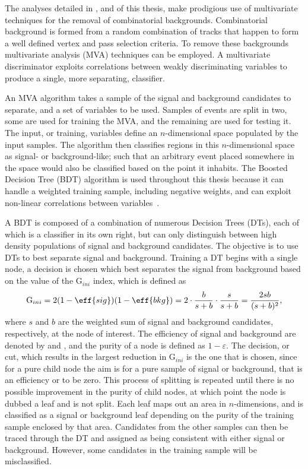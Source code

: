 
The analyses detailed in ,  and  of this thesis, make
prodigious use of multivariate techniques for the removal of combinatorial backgrounds.
Combinatorial background is formed from a random combination of tracks that happen to form a well
defined vertex and pass selection criteria.
To remove these backgrounds multivariate analysis (MVA) techniques can be employed.
A multivariate discriminator exploits correlations between weakly discriminating variables to
produce a single, more separating, classifier.

An MVA algorithm takes a sample of the signal and background candidates to separate, and a set of
variables to be used.
Samples of events are split in two, some are used for training the MVA, and the remaining are used
for testing it.
The input, or training, variables define an $n$-dimensional space populated by the input samples.
The algorithm then classifies regions in this $n$-dimensional space as signal- or background-like;
such that an arbitrary event placed somewhere in the space would also be classified based on the
point it inhabits.
The Boosted Decision Tree (BDT) algorithm is used throughout this thesis because it can handle
a weighted training sample, including negative weights, and can exploit non-linear correlations
between variables~\cite{Breiman,Roe}.

A BDT is composed of a combination of numerous Decision Trees (DTs), each of which is a classifier
in its own right, but can only distinguish between high density populations of signal and
background candidates.
The objective is to use DTs to best separate signal and background.
Training a DT begins with a single node, a decision is chosen which best separates the signal from
background based on the value of the $\mathrm{G}_{ini}$ index, which is defined as
\begin{equation}
  \mathrm{G}_{ini} = 2(1-\eff{sig})(1-\eff{bkg}) = 2\cdot\frac{b}{s+b}\cdot\frac{s}{s+b}
  = \frac{2sb}{(s+b)^2},
\end{equation}
where $s$ and $b$ are the weighted sum of signal and background candidates, respectively, at the
node of interest.
The efficiency of signal and background are denoted by  and , and the purity of a
node is defined as $1-\varepsilon$.
The decision, or cut, which results in the largest reduction in $\mathrm{G}_{ini}$ is the one that
is chosen, since for a pure child node the aim is for a pure sample of signal or background, that
is an efficiency  or  to be zero.
This process of splitting is repeated until there is no possible improvement in the purity of child
nodes, at which point the node is dubbed a leaf and is not split.
Each leaf maps out an area in $n$-dimensions, and is classified as a signal or background leaf
depending on the purity of the training sample enclosed by that area.
Candidates from the other samples can then be traced through the DT and assigned as being
consistent with either signal or background.
However, some candidates in the training sample will be misclassified.

